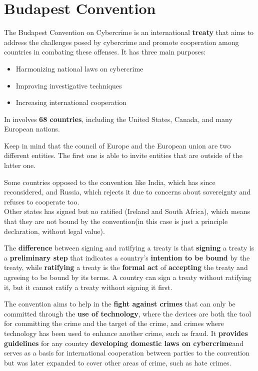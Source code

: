 \section{Budapest Convention}
The Budapest Convention on Cybercrime is an international
\textbf{treaty} that aims to address the challenges posed by
cybercrime and promote cooperation among countries in combating these
offenses.
It has three main purposes:
\begin{itemize}
  \item Harmonizing national laws on cybercrime
  \item Improving investigative techniques
  \item Increasing international cooperation
\end{itemize}
In involves \textbf{68 countries}, including the United States,
Canada, and many European nations.
\begin{boxH}
  Keep in mind that the council of Europe and the European union are
  two different entities. The first one is able to invite entities
  that are outside of the latter one.
\end{boxH}

Some countries opposed to the convention like India, which has since
reconsidered, and Russia, which rejects it due to concerns about
sovereignty and refuses to cooperate too.\\
Other states has signed but no ratified (Ireland and South Africa),
which means that they are not bound by the convention(in this case is
just a principle declaration, without legal value).
\begin{boxH}
  The \textbf{difference} between signing and ratifying a treaty is
  that \textbf{signing} a treaty is a \textbf{preliminary step} that
  indicates a country's \textbf{intention to be bound} by the treaty,
  while \textbf{ratifying} a treaty is the \textbf{formal act} of
  \textbf{accepting} the treaty and agreeing to be bound by its terms.
  A country can sign a treaty without ratifying it, but it cannot
  ratify a treaty without signing it first.
\end{boxH}
The convention aims to help in the \textbf{fight against crimes} that
can only be committed through the \textbf{use of technology}, where
the devices are both the tool for committing the crime and the target
of the crime, and crimes where technology has been used to enhance
another crime, such as fraud. It \textbf{provides guidelines} for any
country \textbf{developing domestic laws on cybercrime}and serves as a
basis for international cooperation between parties to the convention
but was later expanded to cover other areas of crime, such as hate
crimes.
